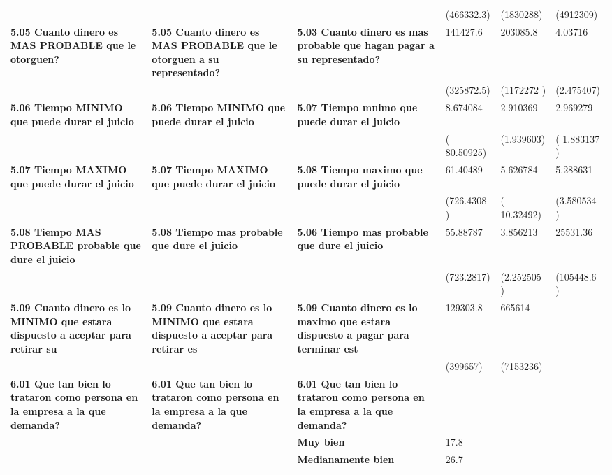 \begin{longtable}{p{3cm}p{3cm}p{3cm}p{1.5cm}p{1.5cm}p{1.5cm}}
\textbf{ } & \textbf{ } & \textbf{ } & (466332.3) & (1830288) & (4912309) \\
\textbf{5.05 Cuanto dinero es MAS PROBABLE que le otorguen?} & \textbf{5.05 Cuanto dinero es MAS PROBABLE que le otorguen a su representado?} & \textbf{5.03 Cuanto dinero es mas probable que hagan pagar a su representado?} & 141427.6 & 203085.8 & 4.03716 \\
\textbf{ } & \textbf{ } & \textbf{ } & (325872.5) & (1172272 ) & (2.475407) \\
\textbf{5.06 Tiempo MINIMO que puede durar el juicio} & \textbf{5.06 Tiempo MINIMO que puede durar el juicio} & \textbf{5.07 Tiempo mnimo que puede durar el juicio} & 8.674084 & 2.910369 & 2.969279 \\
\textbf{ } & \textbf{ } & \textbf{ } & ( 80.50925) & (1.939603) & ( 1.883137 ) \\
\textbf{5.07 Tiempo MAXIMO que puede durar el juicio} & \textbf{5.07 Tiempo MAXIMO que puede durar el juicio} & \textbf{5.08 Tiempo maximo que puede durar el juicio} & 61.40489 & 5.626784 & 5.288631 \\
\textbf{ } & \textbf{ } & \textbf{ } & (726.4308 ) & ( 10.32492) & (3.580534 ) \\
\textbf{5.08 Tiempo MAS PROBABLE probable que dure el juicio} & \textbf{5.08 Tiempo mas probable que dure el juicio} & \textbf{5.06 Tiempo mas probable que dure el juicio} & 55.88787 & 3.856213 & 25531.36 \\
\textbf{ } & \textbf{ } & \textbf{ } & (723.2817) & (2.252505 ) & (105448.6 ) \\
\textbf{5.09 Cuanto dinero es lo MINIMO que estara dispuesto a aceptar para retirar su} & \textbf{5.09 Cuanto dinero es lo MINIMO que estara dispuesto a aceptar para retirar es} & \textbf{5.09 Cuanto dinero es lo maximo que estara dispuesto a pagar para terminar est} & 129303.8 & 665614 &  \\
\textbf{ } & \textbf{ } & \textbf{ } & (399657) & (7153236) &  \\
\textbf{6.01 Que tan bien lo trataron como persona en la empresa a la que demanda?} & \textbf{6.01 Que tan bien lo trataron como persona en la empresa a la que demanda?} & \textbf{6.01 Que tan bien lo trataron como persona en la empresa a la que demanda?} &       &       &  \\
\textbf{ } & \textbf{ } & \textbf{Muy bien} & 17.8  &       &  \\
\textbf{ } & \textbf{ } & \textbf{Medianamente bien} & 26.7  &       &  \\

\end{longtable}
